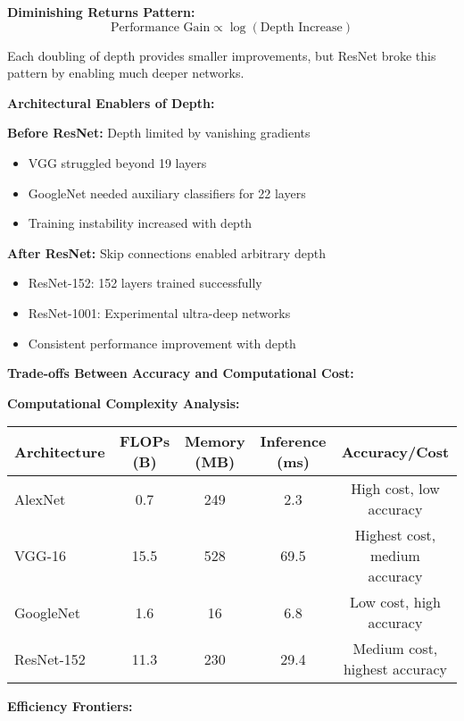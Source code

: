 \documentclass[12pt]{article}
\begin{document}
\begin{enumerate}[(a)]
{    \textbf{Diminishing Returns Pattern:}
    $$\text{Performance Gain} \propto \log(\text{Depth Increase})$$
    
    Each doubling of depth provides smaller improvements, but ResNet broke this pattern by enabling much deeper networks.
    
    \textbf{Architectural Enablers of Depth:}
    
    \textbf{Before ResNet:} Depth limited by vanishing gradients
    \begin{itemize}
        \item VGG struggled beyond 19 layers
        \item GoogleNet needed auxiliary classifiers for 22 layers
        \item Training instability increased with depth
    \end{itemize}
    
    \textbf{After ResNet:} Skip connections enabled arbitrary depth
    \begin{itemize}
        \item ResNet-152: 152 layers trained successfully
        \item ResNet-1001: Experimental ultra-deep networks
        \item Consistent performance improvement with depth
    \end{itemize}
    
    \textbf{Trade-offs Between Accuracy and Computational Cost:}
    
    \textbf{Computational Complexity Analysis:}
    
    \begin{center}
    \begin{tabular}{|l|c|c|c|c|}
    \hline
    Architecture & FLOPs (B) & Memory (MB) & Inference (ms) & Accuracy/Cost \\
    \hline
    AlexNet & 0.7 & 249 & 2.3 & High cost, low accuracy \\
    VGG-16 & 15.5 & 528 & 69.5 & Highest cost, medium accuracy \\
    GoogleNet & 1.6 & 16 & 6.8 & Low cost, high accuracy \\
    ResNet-152 & 11.3 & 230 & 29.4 & Medium cost, highest accuracy \\
    \hline
    \end{tabular}
    \end{center}
    
    \textbf{Efficiency Frontiers:}
    
}
\end{enumerate}
\end{document}
